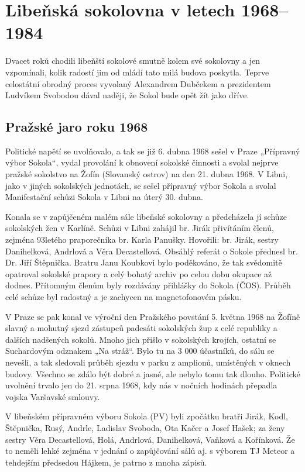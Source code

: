 \section{Libeňská sokolovna v letech
1968--1984}\label{libeux148skuxe1-sokolovna-v-letech-19681984}

Dvacet roků chodili libeňští sokolové smutně kolem své sokolovny a jen
vzpomínali, kolik radostí jim od mládí tato milá budova poskytla. Teprve
celostátní obrodný proces vyvolaný Alexandrem Dubčekem a prezidentem
Ludvíkem Svobodou dával naději, že Sokol bude opět žít jako dříve.

\subsection{Pražské jaro roku 1968}\label{praux17eskuxe9-jaro-roku-1968}

Politické napětí se uvolňovalo, a tak se již 6. dubna 1968 sešel v Praze
„Přípravný výbor Sokola``, vydal provolání k obnovení sokolské činnosti
a svolal nejprve pražské sokolstvo na Žofín (Slovanský ostrov) na den
21. dubna 1968. V Libni, jako v jiných sokolských jednotách, se sešel
přípravný výbor Sokola a svolal Manifestační schůzi Sokola v Libni na
úterý 30. dubna.

Konala se v zapůjčeném malém sále libeňské sokolovny a předcházela jí
schůze sokolských žen v Karlíně. Schůzi v Libni zahájil br. Jirák
přivítáním členů, zejména 93letého praporečníka br. Karla Panušky.
Hovořili: br. Jirák, sestry Danihelková, Andrlová a Věra Decastellová.
Obsáhlý referát o Sokole přednesl br. Dr. Jiří Štěpnička. Bratru Janu
Koubkovi bylo poděkováno, že tak svědomitě opatroval sokolské prapory a
celý bohatý archiv po celou dobu okupace až dodnes. Přítomným členům
byly rozdávány přihlášky do Sokola (ČOS). Průběh celé schůze byl
radostný a je zachycen na magnetofonovém pásku.

V Praze se pak konal ve výroční den Pražského povstání 5. května 1968 na
Žofíně slavný a mohutný sjezd zástupců padesáti sokolských žup z celé
republiky a dalších nadšených sokolů. Mnoho jich přišlo v sokolských
krojích, ostatní se Suchardovým odznakem „Na stráž``. Bylo tu na 3 000
účastníků, do sálu se nevešli, a tak sledovali průběh sjezdu v parku z
amplionů, umístěných v oknech budovy. Všechno se zdálo být dobré a
jasné, ale nebylo tomu tak dlouho. Politické uvolnění trvalo jen do 21.
srpna 1968, kdy nás v nočních hodinách přepadla vojska Varšavské
smlouvy.

V libeňském přípravném výboru Sokola (PV) byli zpočátku bratři Jirák,
Kodl, Štěpnička, Rusý, Andrle, Ladislav Svoboda, Ota Kačer a Josef
Hašek; za ženy sestry Věra Decastellová, Holá, Andrlová, Danihelková,
Vaňková a Kořínková. Že to neměli lehké zejména v jednání o zapůjčování
sálů aj. s výborem TJ Meteor a tehdejším předsedou Hájkem, je patrno z
mnoha zápisů.

